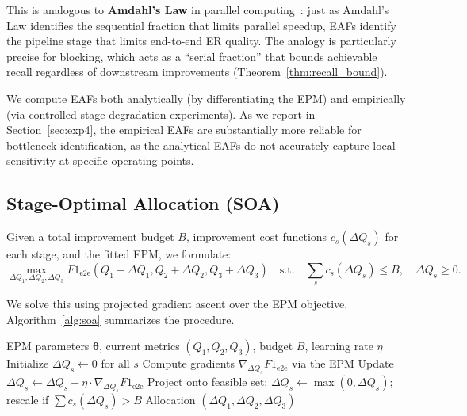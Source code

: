 \documentclass{article}
\newcommand{\Fee}{F1_{\mathrm{e2e}}}
\begin{document}
This is analogous to \textbf{Amdahl's Law} in parallel computing~\citep{amdahl1967validity}: just as Amdahl's Law identifies the sequential fraction that limits parallel speedup, EAFs identify the pipeline stage that limits end-to-end ER quality.
The analogy is particularly precise for blocking, which acts as a ``serial fraction'' that bounds achievable recall regardless of downstream improvements (Theorem~\ref{thm:recall_bound}).

We compute EAFs both analytically (by differentiating the EPM) and empirically (via controlled stage degradation experiments). As we report in Section~\ref{sec:exp4}, the empirical EAFs are substantially more reliable for bottleneck identification, as the analytical EAFs do not accurately capture local sensitivity at specific operating points.

\subsection{Stage-Optimal Allocation (SOA)}

Given a total improvement budget $B$, improvement cost functions $c_s(\Delta Q_s)$ for each stage, and the fitted EPM, we formulate:
\begin{equation}
    \max_{\Delta Q_1, \Delta Q_2, \Delta Q_3} \Fee(Q_1 + \Delta Q_1, Q_2 + \Delta Q_2, Q_3 + \Delta Q_3) \quad \text{s.t.} \quad \sum_s c_s(\Delta Q_s) \leq B, \quad \Delta Q_s \geq 0.
\end{equation}

We solve this using projected gradient ascent over the EPM objective. Algorithm~\ref{alg:soa} summarizes the procedure.

\begin{algorithm}[t]
\caption{Stage-Optimal Allocation (SOA)}
\label{alg:soa}
\begin{algorithmic}[1]
\REQUIRE EPM parameters $\boldsymbol{\theta}$, current metrics $(Q_1, Q_2, Q_3)$, budget $B$, learning rate $\eta$
\STATE Initialize $\Delta Q_s \leftarrow 0$ for all $s$
    \STATE Compute gradients $\nabla_{\Delta Q_s} \Fee$ via the EPM
    \STATE Update $\Delta Q_s \leftarrow \Delta Q_s + \eta \cdot \nabla_{\Delta Q_s} \Fee$
    \STATE Project onto feasible set: $\Delta Q_s \leftarrow \max(0, \Delta Q_s)$; rescale if $\sum c_s(\Delta Q_s) > B$
\ENDFOR
\RETURN Allocation $(\Delta Q_1, \Delta Q_2, \Delta Q_3)$
\end{algorithmic}
\end{algorithm}
\end{document}

